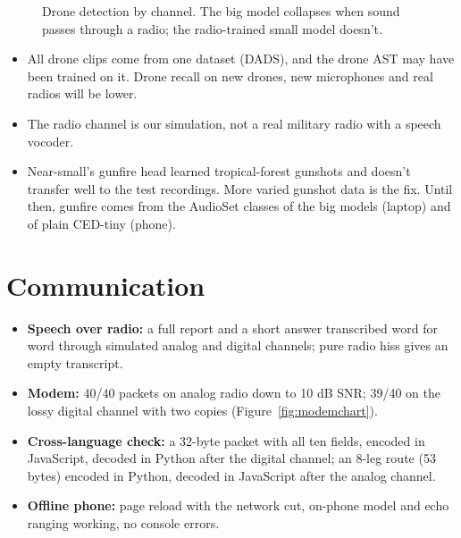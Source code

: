 \begin{figure}[htbp]\centering
{}
\caption{Drone detection by channel. The big model collapses when sound passes through a radio; the radio-trained small
model doesn't.}\label{fig:dronechart}
\end{figure}

\begin{caveat}
\begin{itemize}
  \item All drone clips come from one dataset (DADS), and the drone AST may have been trained on it. Drone recall on new drones,
        new microphones and real radios will be lower.
  \item The radio channel is our simulation, not a real military radio with a speech vocoder.
  \item Near-small's gunfire head learned tropical-forest gunshots and doesn't transfer well to the test recordings. More varied
        gunshot data is the fix. Until then, gunfire comes from the AudioSet classes of the big models (laptop) and of plain CED-tiny
        (phone).
\end{itemize}
\end{caveat}

\section{Communication}

\begin{itemize}
  \item \textbf{Speech over radio:} a full report and a short answer transcribed word for word through simulated analog and digital
        channels; pure radio hiss gives an empty transcript.
  \item \textbf{Modem:} 40/40 packets on analog radio down to 10 dB SNR; 39/40 on the lossy digital channel with two copies
        (Figure~\ref{fig:modemchart}).
  \item \textbf{Cross-language check:} a 32-byte packet with all ten fields, encoded in JavaScript, decoded in Python after the digital
        channel; an 8-leg route (53 bytes) encoded in Python, decoded in JavaScript after the analog channel.
  \item \textbf{Offline phone:} page reload with the network cut, on-phone model and echo ranging working, no console errors.
\end{itemize}

